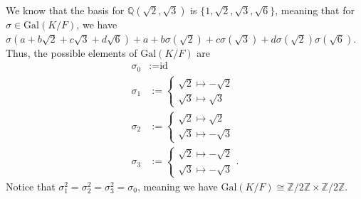 \documentclass[10pt]{extarticle}
\newcommand{\Q}{\mathbb{Q}}
\newcommand{\Z}{\mathbb{Z}}
\begin{document}
  We know that the basis for $\Q(\sqrt{2},\sqrt{3})$ is $\{1,\sqrt{2},\sqrt{3},\sqrt{6}\}$, meaning that for $\sigma\in \text{Gal}(K/F)$, we have $\sigma(a + b\sqrt{2} + c\sqrt{3} + d\sqrt{6}) + a + b\sigma(\sqrt{2}) + c\sigma(\sqrt{3}) + d\sigma(\sqrt{2})\sigma(\sqrt{6})$. Thus, the possible elements of $\text{Gal}(K/F)$ are
  \begin{align*}
    \sigma_0 &:= \text{id}\\
    \sigma_1 &:= \begin{cases}
      \sqrt{2} \mapsto -\sqrt{2}\\
      \sqrt{3} \mapsto \sqrt{3}
    \end{cases}\\
      \sigma_2 &:= \begin{cases}
        \sqrt{2} \mapsto \sqrt{2}\\
        \sqrt{3} \mapsto -\sqrt{3}
      \end{cases}\\
        \sigma_3 &:= \begin{cases}
          \sqrt{2} \mapsto -\sqrt{2}\\
          \sqrt{3} \mapsto -\sqrt{3}
        \end{cases}.
  \end{align*}
  Notice that $\sigma_1^{2} = \sigma_2^{2} = \sigma_3^{2} = \sigma_0$, meaning we have $\text{Gal}(K/F)\cong \Z/2\Z\times \Z/2\Z$.
\end{document}
